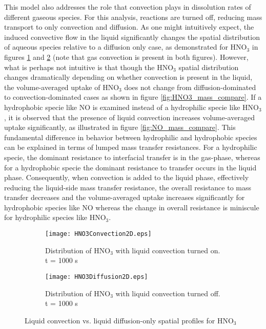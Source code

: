 This model also addresses the role that convection plays in dissolution rates of different gaseous species. For this analysis, reactions are turned off, reducing mass transport to only convection and diffusion. As one might intuitively expect, the induced convective flow in the liquid significantly changes the spatial distribution of aqueous species relative to a diffusion only case, as demonstrated for HNO$_3$ in figures \ref{fig:HNO3_convec} and \ref{fig:HNO3_diffus} (note that gas convection is present in both figures). However, what is perhaps not intuitive is that though the HNO$_3$ spatial distribution changes dramatically depending on whether convection is present in the liquid, the volume-averaged uptake of HNO$_3$ does not change from diffusion-dominated to convection-dominated cases as shown in figure \ref{fig:HNO3_mass_compare}. If a hydrophobic specie like NO is examined instead of a hydrophilic specie like HNO$_3$, it is observed that the presence of liquid convection increases volume-averaged uptake significantly, as illustrated in figure \ref{fig:NO_mass_compare}. This fundamental difference in behavior between hydrophilic and hydrophobic species can be explained in terms of lumped mass transfer resistances. For a hydrophilic specie, the dominant resistance to interfacial transfer is in the gas-phase, whereas for a hydrophobic specie the dominant resistance to transfer occurs in the liquid phase. \cite[p. 249]{carberry2001chemical} Consequently, when convection is added to the liquid phase, effectively reducing the liquid-side mass transfer resistance, the overall resistance to mass transfer decreases and the volume-averaged uptake increases significantly for hydrophobic species like NO whereas the change in overall resistance is miniscule for hydrophilic species like HNO$_3$.

\begin{figure}[htpb]
    \centering
    \begin{subfigure}[b]{.7\textwidth}
        \texttt{[image: HNO3Convection2D.eps]}
        \caption{Distribution of HNO$_3$ with liquid convection turned on. t = 1000 s}
        \label{fig:HNO3_convec}
    \end{subfigure}
    \begin{subfigure}[b]{.7\textwidth}
        \texttt{[image: HNO3Diffusion2D.eps]}
        \caption{Distribution of HNO$_3$ with liquid convection turned off. t = 1000 s}
        \label{fig:HNO3_diffus}
    \end{subfigure}
    \caption{Liquid convection vs. liquid diffusion-only spatial profiles for HNO$_3$}
    \label{fig:HNO3}
\end{figure}

